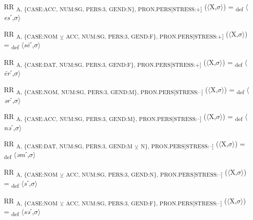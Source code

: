 {\begin{exe}
 RR \textsubscript{A, \{CASE:ACC, NUM:SG, PERS:3, GEND:N\}, PRON.PERS[STRESS:+]} ($\langle$X,$\sigma $$\rangle$) = \textsubscript{def} $\langle$\textit{es}ˊ,$\sigma $$\rangle$
\end{exe}

\begin{exe}
 RR \textsubscript{A, \{CASE:NOM} \textsubscript{${\veebar}$}\textsubscript{ ACC, NUM:SG, PERS:3, GEND:F\}, PRON.PERS[STRESS:+]} ($\langle$X,$\sigma $$\rangle$) = \textsubscript{def} $\langle$\textit{s\=e}ˊ,$\sigma $$\rangle$
\end{exe}

\begin{exe}
 RR \textsubscript{A, \{CASE:DAT, NUM:SG, PERS:3, GEND:F\}, PRON.PERS[STRESS:+]} ($\langle$X,$\sigma $$\rangle$) = \textsubscript{def} $\langle$\textit{\=er}ˊ,$\sigma $$\rangle$
\end{exe}

\begin{exe}
 RR \textsubscript{A, \{CASE:NOM, NUM:SG, PERS:3, GEND:M\}, PRON.PERS[STRESS:–]} ($\langle$X,$\sigma $$\rangle$) = \textsubscript{def} $\langle$\textit{ər}ˊ,$\sigma $$\rangle$
\end{exe}

\begin{exe}
 RR \textsubscript{A, \{CASE:ACC, NUM:SG, PERS:3, GEND:M\}, PRON.PERS[STRESS:–]} ($\langle$X,$\sigma $$\rangle$) = \textsubscript{def} $\langle$\textit{nə}ˊ,$\sigma $$\rangle$
\end{exe}

\begin{exe}
 RR \textsubscript{A, \{CASE:DAT, NUM:SG, PERS:3, GEND:M} \textsubscript{${\veebar}$}\textsubscript{ N\}, PRON.PERS[STRESS:–]} ($\langle$X,$\sigma $$\rangle$) = \textsubscript{def} $\langle$\textit{əm}ˊ,$\sigma $$\rangle$
\end{exe}

\begin{exe}
 RR \textsubscript{A, \{CASE:NOM} \textsubscript{${\veebar}$}\textsubscript{ ACC, NUM:SG, PERS:3, GEND:N\}, PRON.PERS[STRESS:–]} ($\langle$X,$\sigma $$\rangle$) = \textsubscript{def} $\langle$\textit{s}ˊ,$\sigma $$\rangle$
\end{exe}

\begin{exe}
 RR \textsubscript{A, \{CASE:NOM} \textsubscript{${\veebar}$}\textsubscript{ ACC, NUM:SG, PERS:3, GEND:F\}, PRON.PERS[STRESS:–]} ($\langle$X,$\sigma $$\rangle$) = \textsubscript{def} $\langle$\textit{sə}ˊ,$\sigma $$\rangle$
\end{exe}

}
